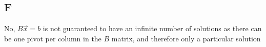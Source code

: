 \documentclass{report}
\begin{document}
\subsection*{F}

No, \(B \vec{x} = b\) is not guaranteed to have an infinite number of solutions as there can be one pivot per column in the \(B\) matrix, and therefore only a particular solution 
\end{document}
